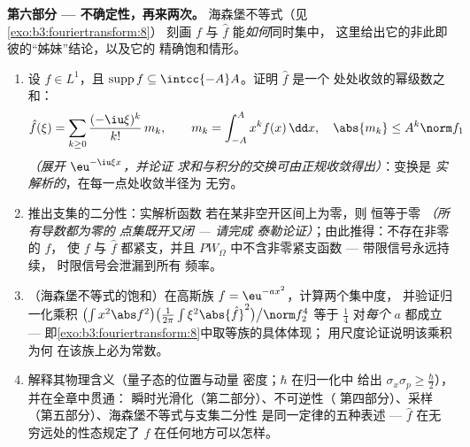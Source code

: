 \begin{problem}[{周末问题 --- $\partial_tu =
\partial^2_{xx}u$，从头到尾求解}]
\medskip
\noindent\textbf{第六部分 --- 不确定性，再来两次。}
海森堡不等式（见\cref{exo:b3:fouriertransform:8}）
刻画 $f$ 与 $\hat f$ 能\emph{如何}同时集中，
这里给出它的非此即彼的“姊妹”结论，以及它的
精确饱和情形。
\begin{enumerate}[resume]
  \item 设 $f \in L^1$，且 $\operatorname{supp}f \subseteq
        \intcc{-A}A$。证明 $\hat f$ 是一个
        处处收敛的幂级数之和：
        \[
        \hat f(\xi) = \sum_{k\geq0}\frac{(-\iu\xi)^k}{k!}
        \,m_k, \qquad m_k = \int_{-A}^{A}x^kf(x)\,\dd x,
        \quad \abs{m_k} \leq A^k\norm f_1
        \]
        \emph{（展开 $\eu^{-\iu\xi x}$，并论证
        求和与积分的交换可由正规收敛得出）}：变换是
        \emph{实解析的}，在每一点处收敛半径为
        无穷。
  \item 推出支集的二分性：实解析函数
        若在某非空开区间上为零，则
        恒等于零 \emph{（所有导数都为零的
        点集既开又闭 --- 请完成
        泰勒论证）}；由此推得：不存在非零的 $f$，
        使 $f$ 与 $\hat f$ 都紧支，并且
        $PW_\Omega$ 中不含非零紧支函数
        --- 带限信号永远持续，
        时限信号会泄漏到所有
        频率。
  \item （海森堡不等式的饱和）在高斯族 $f
        = \eu^{-ax^2}$，计算两个集中度，
        并验证归一化乘积
        $\bigl(\int x^2\abs f^2\bigr)\bigl(\frac1{2\pi}\int
        \xi^2\abs{\hat f}^2\bigr)\big/\norm f_2^4$ 等于
        $\frac14$ 对\emph{每个} $a$ 都成立 ---
        即\cref{exo:b3:fouriertransform:8}中取等族的具体体现；
        用尺度论证说明该乘积为何
        在该族上必为常数。
  \item 解释其物理含义（量子态的位置与动量
        密度；$\hbar$ 在归一化中
        给出 $\sigma_x\sigma_p \geq
        \frac\hbar2$），并在全章中贯通：
        瞬时光滑化（第二部分）、不可逆性（
        第四部分）、采样（第五部分）、海森堡不等式与支集二分性
        是同一定律的五种表述 ---
        $\hat f$ 在无穷远处的性态规定了 $f$
        在任何地方可以怎样。
\end{enumerate}


\end{problem}
